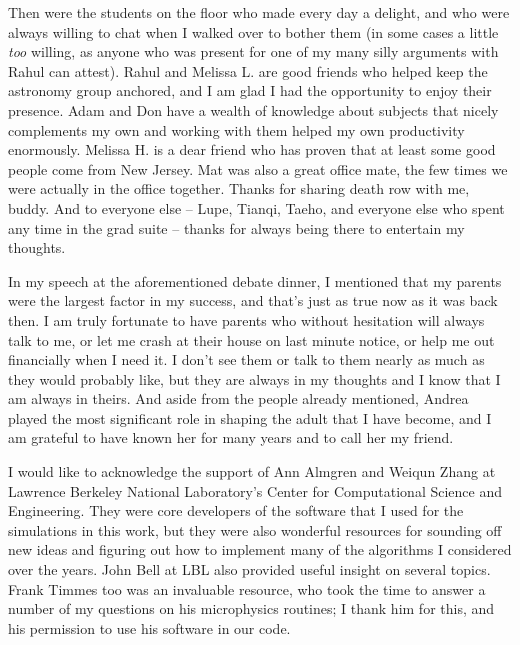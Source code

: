 \documentclass[12pt]{article}
\begin{document}
Then were the students on the floor who made every day a delight, and who
were always willing to chat when I walked over to bother them (in some cases
a little \textit{too} willing, as anyone who was present for one of my many
silly arguments with Rahul can attest). Rahul and Melissa L. are good friends 
who helped keep the astronomy group anchored, and I am glad I had the 
opportunity to enjoy their presence. Adam and Don have a wealth of knowledge 
about subjects that nicely complements my own and working with them helped my 
own productivity enormously. Melissa H. is a dear friend who has proven
that at least some good people come from New Jersey. Mat 
was also a great office mate, the few times we were actually in the office 
together. Thanks for sharing death row with me, buddy. And to everyone else
-- Lupe, Tianqi, Taeho, and everyone else who spent any time in the grad 
suite -- thanks for always being there to entertain my thoughts.

In my speech at the aforementioned debate dinner, I mentioned that my 
parents were the largest factor in my success, and that's just as true 
now as it was back then. I am truly fortunate to have parents who without 
hesitation will always talk to me, or let me crash at their house on 
last minute notice, or help me out financially when I need it. I don't 
see them or talk to them nearly as much as they would probably like, 
but they are always in my thoughts and I know that I am always in theirs.
And aside from the people already mentioned, Andrea played the most significant 
role in shaping the adult that I have become, and I am grateful to have known 
her for many years and to call her my friend.

I would like to acknowledge the support of Ann Almgren and Weiqun 
Zhang at Lawrence Berkeley National Laboratory's Center for Computational 
Science and Engineering. They were core developers of the software that 
I used for the simulations in this work, but they were also wonderful resources 
for sounding off new ideas and figuring out how to implement many of the 
algorithms I considered over the years. John Bell at LBL also provided useful
insight on several topics. Frank Timmes too was an invaluable resource, who
took the time to answer a number of my questions on his microphysics routines;
I thank him for this, and his permission to use his software in our code.
\end{document}
